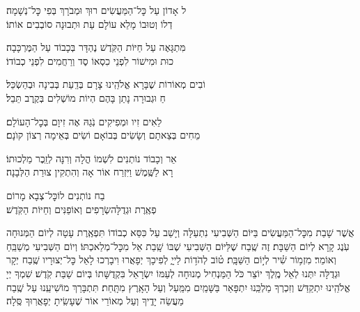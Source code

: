 ל אָדוֹן עַל כׇּל־הַמַּעֲשִׂים \hfill {}רוּךְ וּמְבֹרָךְ בְּפִי כׇּל־נְשָׁמָה׃ \\
דְלוֹ וְטוּבוֹ מָלֵא עוֹלָם \hfill {}עַת וּתְבוּנָה סוֹבְבִים אוֹתוֹ׃

מִּתְגָּאֶה עַל חַיּוֹת הַקֹּֽדֶשׁ \hfill {}נֶהְדָּר בְּכָבוֹד עַל הַמֶּרְכָּבָה׃\\
כוּת וּמִישׁוֹר לִפְנֵי כִסְאוֹ \hfill {}סֶד וְרַחֲמִים לִפְנֵי כְבוֹדוֹ׃

וֹבִים מְאוֹרוֹת שֶׁבָּרָא אֱלֹהֵֽינוּ \hfill {}צָרָם בְּדַֽעַת בְּבִינָה וּבְהַשְׂכֵּל׃\\
חַ וּגְבוּרָה נָתַן בָּהֶם \hfill {}הְיוֹת מוֹשְׁלִים בְּקֶֽרֶב תֵּבֵל׃

לֵאִים זִיו וּמְפִיקִים נֹֽגַהּ \hfill {}אֶה זִיוָם בְּכׇל־הָעוֹלָם׃ \\
מֵחִים בְּצֵאתָם וְשָׂשִׂים בְּבוֹאָם \hfill {}וֹשִׂים בְּאֵימָה רְצוֹן קוׂנָם׃

אֵר וְכָבוֹד נוֹתְנִים לִשְׁמוֹ \hfill {}הֳלָה וְרִנָּה לְזֵֽכֶר מַלְכוּתוֹ׃ \\
רָא לַשֶּֽׁמֶשׁ וַיִּזְרַח אוֹר \hfill {}אָה וְהִתְקִין צוּרַת הַלְּבָנָה׃

בַח נוֹתְנִים לוֹ\hfill כׇּל־צְבָא מָרוֹם \\ פְאֶֽרֶת וּגְדֻלָּה\hfill שְׂרָפִים וְאוֹפַנִּים וְחַיּוֹת הַקֹּֽדֶשׁ׃

אֲשֶׁר שָׁבַת מִכׇּל־הַמַּעֲשִׂים בַּיּוֹם הַשְּׁבִיעִי נִתְעַלָּה וְיָשַׁב עַל כִּסֵּא כְבוֹדוֹ \middot תִּפְאֶֽרֶת עָטָה לְיוֹם הַמְּנוּחָה עֹֽנֶג קָרָא לְיוֹם הַשַּׁבָּת׃
זֶה שֶֽׁבַח שֶׁלַּיּוֹם הַשְּׁבִיעִי שֶׁבּוֹ שָֽׁבַת אֵל מִכׇּל־מְלַאכְתּוֹ׃ וְיוֹם הַשְּׁבִיעִי מְשַׁבֵּֽחַ וְאוֹמֵר׃
%
מִזְמ֥וֹר שִׁ֗יר לְי֣וֹם הַשַּׁבָּֽת׃ ט֗וֹב לְהֹד֥וֹת לַייָ֑
לְפִיכָךְ יְפָאֲרוּ וִיבָרְכוּ לָאֵל כׇּל־יְצוּרָיו \middot שֶֽׁבַח יְקָר וּגְדֻלָּה יִתְּנוּ לְאֵל מֶֽלֶךְ יוֹצֵר כֹּל \middot הַמַּנְחִיל מְנוּחָה לְעַמּוֹ יִשְׂרָאֵל בִּקְדֻשָּׁתוֹ בְּיוֹם שַׁבַּת קֹֽדֶשׁ׃
שִׁמְךָ יְיָ אֱלֹהֵֽינוּ יִתְקַדַּשׁ \middot וְזִכְרְךָ מַלְכֵּֽנוּ יִתְפָּאַר בַּשָּׁמַֽיִם מִמַּֽעַל וְעַל הָאָֽרֶץ מִתָּֽחַת׃ תִּתְבָּרַךְ מוֹשִׁיעֵֽנוּ עַל שֶֽׁבַח מַעֲשֵׂה יָדֶֽיךָ וְעַל מְאוֹרֵי אוֹר שֶׁעָשִֽׂיתָ יְפָאֲרֽוּךָ סֶּֽלָה׃


\label{tisbarach}
\yotzerhameoros

\ahavaraba

\shema

\veahavta

